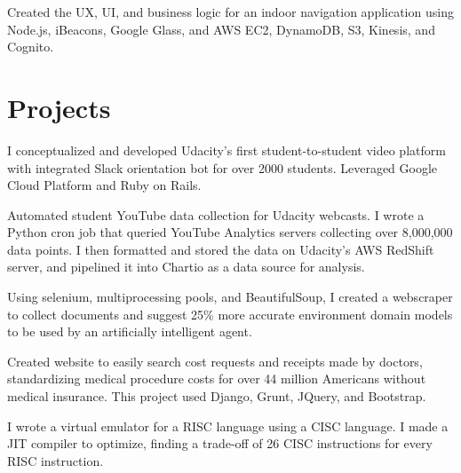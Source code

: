 \documentclass[]{deedy-resume-openfont}
\begin{document}
\begin{minipage}[t]{0.66\textwidth}
\begin{tightemize}
\item Created the UX, UI, and business logic for an indoor navigation application using Node.js, iBeacons, Google Glass, and AWS EC2, DynamoDB, S3, Kinesis, and Cognito.
\end{tightemize}


\section{Projects}

\begin{tightemize}
\item I conceptualized and developed Udacity's first student-to-student video platform with integrated Slack orientation bot for over 2000 students. Leveraged Google Cloud Platform and Ruby on Rails.
\end{tightemize}
\sectionsep

\begin{tightemize}
\item Automated student YouTube data collection for Udacity webcasts. I wrote a Python cron job that queried YouTube Analytics servers collecting over 8,000,000 data points. I then formatted and stored the data on Udacity's AWS RedShift server, and pipelined it into Chartio as a data source for analysis.
\end{tightemize}
\sectionsep

\begin{tightemize}
\item Using selenium, multiprocessing pools, and BeautifulSoup, I created a webscraper to collect documents and suggest 25\% more accurate environment domain models to be used by an artificially intelligent agent. 
\end{tightemize}
\sectionsep

\begin{tightemize}
\item Created website to easily search cost requests and receipts made by doctors, standardizing medical procedure costs for over 44 million Americans without medical insurance. This project used Django, Grunt, JQuery, and Bootstrap.
\end{tightemize}
\sectionsep

\begin{tightemize}
\item I wrote a virtual emulator for a RISC language using a CISC language. I made a JIT compiler to optimize, finding a trade-off of 26 CISC instructions for every RISC instruction.
\end{tightemize}


\end{minipage} 
\end{document}
